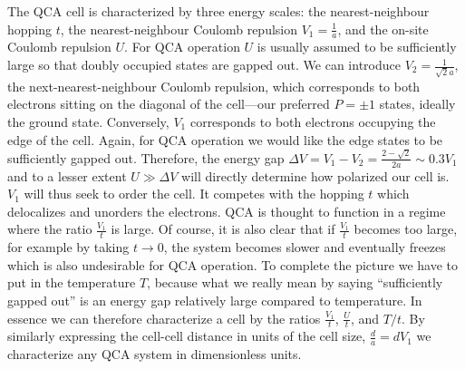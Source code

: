The QCA cell is characterized by three energy scales: the nearest-neighbour
hopping $t$, the nearest-neighbour Coulomb repulsion $V_1 = \frac{1}{a}$, and
the on-site Coulomb repulsion $U$. For QCA operation $U$ is usually assumed to
be sufficiently large so that doubly occupied states are gapped out. We can
introduce $V_2 = \frac{1}{\sqrt{2} a}$, the next-nearest-neighbour Coulomb
repulsion, which corresponds to both electrons sitting on the diagonal of the
cell---our preferred $P=\pm1$ states, ideally the ground state. Conversely,
$V_1$ corresponds to both electrons occupying the edge of the cell. Again, for
QCA operation we would like the edge states to be sufficiently gapped out.
Therefore, the energy gap $\Delta V = V_1 - V_2 = \frac{2 - \sqrt{2}}{2 a} \sim
0.3 V_1$ and to a lesser extent $U \gg \Delta V$ will directly determine how
polarized our cell is. $V_1$ will thus seek to order the cell. It competes with
the hopping $t$ which delocalizes and unorders the electrons. QCA is thought to
function in a regime where the ratio $\frac{V_1}{t}$ is large. Of course, it is
also clear that if $\frac{V_1}{t}$ becomes too large, for example by taking $t
\rightarrow 0$, the system becomes slower and eventually freezes which is also
undesirable for QCA operation. To complete the picture we have to put in the
temperature $T$, because what we really mean by saying ``sufficiently gapped
out'' is an energy gap relatively large compared to temperature. In essence we
can therefore characterize a cell by the ratios $\frac{V_1}{t}$, $\frac{U}{t}$,
and $T/t$. By similarly expressing the cell-cell distance in units of the cell
size, $\frac{d}{a} = d V_1$ we characterize any QCA system in dimensionless
units.

